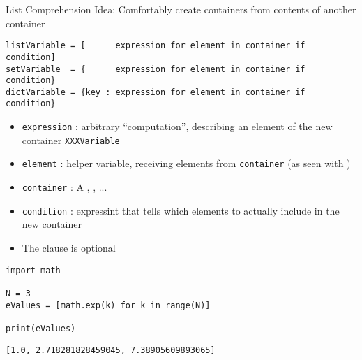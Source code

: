 
\begin{frame}[fragile]{List Comprehension}
%
Idea: Comfortably create containers from contents of another container
\begin{codebox}
\begin{verbatim}
listVariable = [      expression for element in container if condition]
setVariable  = {      expression for element in container if condition}
dictVariable = {key : expression for element in container if condition}
\end{verbatim}
\end{codebox}
%
\begin{itemize}
\item \texttt{expression} : arbitrary \enquote{computation}, describing an element of the new container \texttt{XXXVariable}
\item \texttt{element}    : helper variable, receiving elements from \texttt{container} (as seen with )
\item \texttt{container}  : A , , ...
\item \texttt{condition}  : expressint that tells which elements to actually include in the new container
\item The  clause is optional
\end{itemize}
%
\end{frame}


\begin{frame}[fragile]
%
\begin{codebox}
\begin{verbatim}
import math

N = 3
eValues = [math.exp(k) for k in range(N)]

print(eValues)
\end{verbatim}
\end{codebox}
%
\begin{cmdbox}
\begin{verbatim}
[1.0, 2.718281828459045, 7.38905609893065]
\end{verbatim}
\end{cmdbox}
%
\end{frame}


